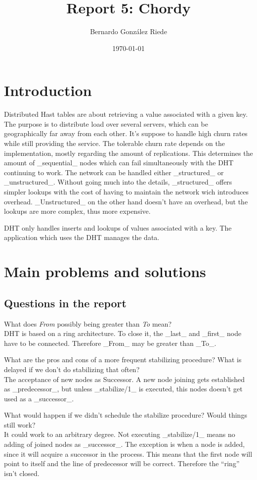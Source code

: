 \documentclass[a4paper, 11pt]{article}
\title{Report 5: Chordy}
\author{Bernardo González Riede}
\date{\today{}}
\begin{document}
\maketitle

\section{Introduction}
Distributed Hast tables are about retrieving a value associated with a given key.
The purpose is to distribute load over several servers, which can be geographically far away from each other.
It's suppose to handle high churn rates while still providing the service.
The tolerable churn rate depends on the implementation, mostly regarding the amount of replications.
This determines the amount of _sequential_ nodes which can fail simultaneously with the DHT continuing to work.
The network can be handled either _structured_ or _unstructured_.
Without going much into the details, _structured_ offers simpler lookups with the cost of having to maintain the network wich introduces overhead.
_Unstructured_ on the other hand doesn't have an overhead, but the lookups are more complex, thus more expensive.

DHT only handles inserts and lookups of values associated with a key.
The application which uses the DHT manages the data.


\section{Main problems and solutions}
\subsection{Questions in the report}
What does \textit{From} possibly being greater than \textit{To} mean?
\\DHT is based on a ring architecture. To close it, the _last_ and _first_ node have to be connected.
Therefore _From_ may be greater than _To_.



What are the pros and cons of a more frequent stabilizing procedure?
What is delayed if we don't do stabilizing that often?
\\ The acceptance of new nodes as Successor. A new node joining gets established as _predecessor_, but unless _stabilize/1_ is executed, this nodes doesn't get used as a _successor_.


What would happen if we didn't schedule the stabilize procedure? Would things still work?
\\It could work to an arbitrary degree. Not executing _stabilize/1_ means no adding of joined nodes as _successor_.
The exception is when a node is added, since it will  acquire a successor in the process.
This means that the first node will point to itself and the line of predecessor will be correct.
Therefore the ``ring'' isn't closed.
\end{document}

